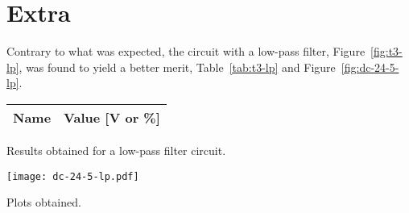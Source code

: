 \section{Extra}
\label{sec:extra}

Contrary to what was expected, the circuit with a low-pass filter,
Figure~\ref{fig:t3-lp}, was found to yield a better merit, Table~\ref{tab:t3-lp} and
Figure~\ref{fig:dc-24-5-lp}.\\

\begin{minipage}[b]{0.48\textwidth}
\centering
   \begin{tabular}{|l|r|}
    \hline    
    {\bf Name} & {\bf Value [V or \%]} \\ \hline
    
   \end{tabular}
  \captionsetup{type=table}
  \caption{Results obtained for a low-pass filter circuit.}
  \label{tab:t3-lp}
\end{minipage}
\hfil
\begin{minipage}[b]{0.48\textwidth}
  \centering
  \texttt{[image: dc-24-5-lp.pdf]}
  \captionsetup{type=figure}
  \caption{Plots obtained.}
  \label{fig:dc-24-5-lp}
\end{minipage}
